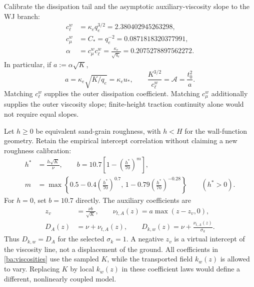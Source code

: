 \documentclass[11pt,a4paper]{article}
\numberwithin{equation}{section}
\begin{document}
Calibrate the dissipation tail and the asymptotic auxiliary-viscosity
slope to the WJ branch:
\begin{equation}
 \boxed{\begin{aligned}
 c_\ell^w&=\kappa_e q_e^{3/2}=2.380402945263298,\\
 c_\mu^w&=C_*=q_e^{-2}=0.0871818320377991,\\
 \alpha&=c_\mu^wc_\ell^w
       =\frac{\kappa_e}{\sqrt{q_e}}=0.2075278897562272.
 \end{aligned}}
 \label{ba:wall-coefficients}
\end{equation}
In particular, if $a:=\alpha\sqrt K$,
\begin{equation}
 \boxed{a=\kappa_e\sqrt{K/q_e}=\kappa_e u_*,
 \qquad
 \frac{K^{3/2}}{c_\ell^w}=\mathcal A=\frac{t_0^2}{a}.}
 \label{ba:calibration-identities}
\end{equation}
Matching $c_\ell^w$ supplies the outer dissipation coefficient. Matching
$c_\mu^w$ additionally supplies the outer viscosity slope; finite-height
traction continuity alone would not require equal slopes.

Let $h\geq0$ be equivalent sand-grain roughness, with $h<H$ for the
wall-function geometry. Retain the empirical intercept correlation
\cite[Eqs.~(24)--(25)]{SCI2006} without claiming a new roughness calibration:
\begin{equation}
 \begin{aligned}
 h^*&=\frac{h\sqrt K}{\nu},\qquad
 b=10.7\left[1-\left(\frac{h^*}{70}\right)^m\right],\\
 m&=\max\left\{
 0.5-0.4\left(\frac{h^*}{70}\right)^{0.7},\,
 1-0.79\left(\frac{h^*}{70}\right)^{-0.28}\right\}
 \qquad(h^*>0).
 \end{aligned}
 \label{ba:roughness-correlation}
\end{equation}
For $h=0$, set $b=10.7$ directly. The auxiliary coefficients are
\begin{equation}
 \boxed{\begin{aligned}
 z_v&=\frac{\nu b}{\sqrt K},\qquad
 \nu_{t,A}(z)=a\max(z-z_v,0),\\
 D_A(z)&=\nu+\nu_{t,A}(z),\qquad
 D_{k,w}(z)=\nu+\frac{\nu_{t,A}(z)}{\sigma_k}.
 \end{aligned}}
 \label{ba:viscosities}
\end{equation}
Thus $D_{k,w}=D_A$ for the selected $\sigma_k=1$. A negative $z_v$ is a
virtual intercept of the viscosity line, not a displacement of the ground.
All coefficients in \eqref{ba:viscosities} use the sampled $K$, while
the transported field $k_w(z)$ is allowed to vary. Replacing $K$ by
local $k_w(z)$ in these coefficient laws would define a different,
nonlinearly coupled model.
\end{document}
